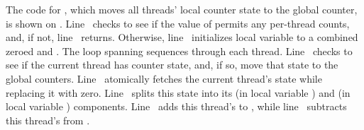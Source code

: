 \begin{fcvref}
The code for , which moves all threads' local
counter state to the global counter, is shown on
.
Line~ checks to see if the value of
 permits
any per-thread counts, and, if not, line~ returns.
Otherwise, line~ initializes local variable  to a combined
zeroed  and .
The loop spanning  sequences
through each thread.
Line~ checks to see if the current thread has counter state,
and, if so,  move that state
to the global counters.
Line~ atomically fetches the current thread's state
while replacing it with zero.
Line~ splits this state into its 
(in local variable )
and  (in local variable ) components.
Line~ adds this thread's  to , while
line~ subtracts this thread's  from .
\end{fcvref}

